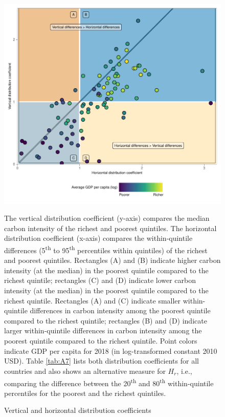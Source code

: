 \documentclass[12pt, a4paper]{article}
\newenvironment{subcaption2}
{\strut
\vspace{-5pt}
\begin{minipage}[b]{0.95\textwidth}
  \hspace*{-\parindent}
  \footnotesize}
 {\end{minipage}}
\begin{document}
\begin{figure}[ht!]
    \centering
    \includegraphics{Figure 2/Figure_2_2017_B.pdf}
    \caption{Vertical and horizontal distribution coefficients}
    \label{fig:fig_2}
    \begin{subcaption2}
    The vertical distribution coefficient (y-axis) compares the median carbon intensity of the richest and poorest quintiles. The horizontal distribution coefficient (x-axis) compares the within-quintile differences (5\textsuperscript{th} to 95\textsuperscript{th} percentiles within quintiles) of the richest and poorest quintiles. Rectangles (A) and (B) indicate higher carbon intensity (at the median) in the poorest quintile compared to the richest quintile; rectangles (C) and (D) indicate lower carbon intensity (at the median) in the poorest quintile compared to the richest quintile. Rectangles (A) and (C) indicate smaller within-quintile differences in carbon intensity among the poorest quintile compared to the richest quintile; rectangles (B) and (D) indicate larger within-quintile differences in carbon intensity among the poorest quintile compared to the richest quintile. Point colors indicate GDP per capita for 2018 (in log-transformed constant 2010 USD). Table \ref{tab:A7} lists both distribution coefficients for all countries and also shows an alternative measure for $\widehat{H_{r}}$, i.e., comparing the difference between the 20\textsuperscript{th} and 80\textsuperscript{th} within-quintile percentiles for the poorest and the richest quintiles.
    \end{subcaption2}
\end{figure}
\end{document}
